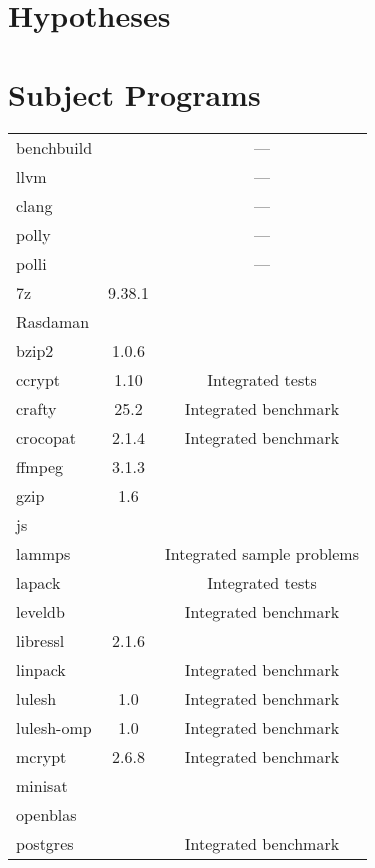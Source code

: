 \section{Hypotheses}

\section{Subject Programs}
\begin{table}[H]
    \myfloatalign
    \begin{tabularx}{\textwidth}{XcC} \toprule
         &  &  \\ \midrule
        benchbuild & & ---\\
        llvm & & ---\\
        clang & & ---\\
        polly & & ---\\
        polli & & ---\\ \midrule
        7z & 9.38.1\\
        Rasdaman & \\
        bzip2 & 1.0.6\\
        ccrypt & 1.10 & Integrated tests\\
        crafty & 25.2 & Integrated benchmark\\
        crocopat & 2.1.4 & Integrated benchmark\\
        ffmpeg & 3.1.3\\
        gzip & 1.6\\
        js\\
        lammps &  & Integrated sample problems\\
        lapack & & Integrated tests\\
        leveldb &  & Integrated benchmark\\
        libressl & 2.1.6\\
        linpack & & Integrated benchmark\\
        lulesh & 1.0 & Integrated benchmark\\
        lulesh-omp & 1.0 & Integrated benchmark\\
        mcrypt & 2.6.8 & Integrated benchmark\\
        minisat & \\
        openblas & \\
        postgres & & Integrated benchmark\\

\end{tabularx}
\end{table}
